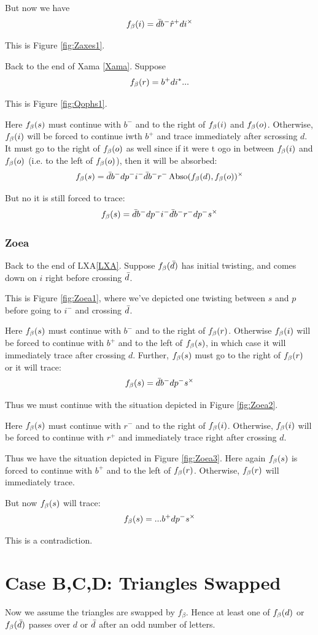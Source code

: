 But now we have
\[
f_\beta(i) = \bar{d} b^- \hat{r}^+ d i^\times
\]

This is Figure \ref{fig:Zaxes1}.

\label{Qophs}
Back to the end of Xama \ref{Xama}. Suppose 
\[
f_\beta(r) = b^+ d i^*...
\]

This is Figure \ref{fig:Qophs1}.

Here $f_\beta(s)$ must continue with $b^-$ and to the right of $f_\beta(i)$ and $f_\beta(o)$. Otherwise, $f_\beta(i)$ will be forced to continue iwth $b^+$ and trace immediately after scrossing $d$. It must go to the right of $f_\beta(o)$ as well since if it were t ogo in between $f_\beta(i)$ and $f_\beta(o)$ (i.e. to the left of $f_\beta(o)$), then it will be absorbed:
\[
f_\beta(s) = \bar{d} b^- d p^- i^- \bar{d} b^- r^- \operatorname{Abso}(f_\beta(d), f_\beta(o))^\times
\]

But no it is still forced to trace:
\[
f_\beta(s) = \bar{d} b^- d p^- i^- \bar{d} b^- r^- d p^- s^\times
\]

\subsubsection{Zoea}\label{Zoea}
Back to the end of LXA\ref{LXA}. Suppose $f_\beta(\bar{d})$ has initial twisting, and comes down on $i$ right before crossing $\bar{d}$.

This is Figure \ref{fig:Zoea1}, where we've depicted one twisting between $s$ and $p$ before going to $i^-$ and crossing $\bar{d}$.

Here $f_\beta(s)$ must continue with $b^-$ and to the right of $f_\beta(r)$. Otherwise $f_\beta(i)$ will be forced to continue with $b^+$ and to the left of $f_\beta(s)$, in which case it will immediately trace after crossing $d$. Further, $f_\beta(s)$ must go to the right of $f_\beta(r)$ or it will trace:
\[
f_\beta(s) = \bar{d} b^- d p^-s^\times
\]

Thus we must continue with the situation depicted in Figure \ref{fig:Zoea2}.

Here $f_\beta(s)$ must continue with $r^-$ and to the right of $f_\beta(i)$. Otherwise, $f_\beta(i)$ will be forced to continue with $r^+$ and immediately trace right after crossing $d$. 

Thus we have the situation depicted in Figure \ref{fig:Zoea3}. Here again $f_\beta(s)$ is forced to continue with $b^+$ and to the left of $f_\beta(r)$. Otherwise, $f_\beta(r)$ will immediately trace.

But now $f_\beta(s)$ will trace:
\[
f_\beta(s) = ... b^+ d p^- s^\times
\]

This is a contradiction.

\section{Case B,C,D: Triangles Swapped} \label{CaseBCDTrack1}
Now we assume the triangles are swapped by $f_\beta$. Hence at least one of $f_\beta(d)$ or $f_\beta(\bar{d})$ passes over $d$ or $\bar{d}$ after an odd number of letters.


